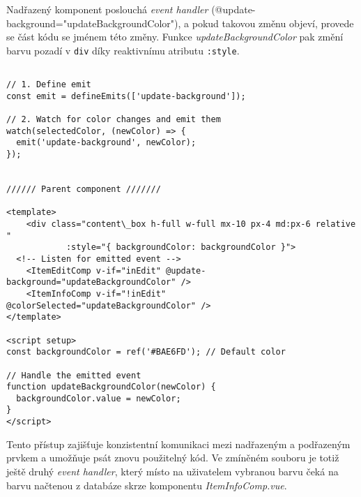 Nadřazený komponent poslouchá \textit{event handler} \newline (@update-background="updateBackgroundColor"), a pokud takovou změnu objeví, provede se část kódu se jménem této změny. Funkce \textit{updateBackgroundColor} pak změní barvu pozadí v \texttt{div} díky reaktivnímu atributu \texttt{:style}.

\newpage
  \begin{lstlisting}[style=JavaScript, firstnumber = 1, caption={Update background; itemEditComp.vue, content.vue}, label={emits}]

// 1. Define emit
const emit = defineEmits(['update-background']);

// 2. Watch for color changes and emit them
watch(selectedColor, (newColor) => {
  emit('update-background', newColor);
});


////// Parent component ///////

<template>
    <div class="content\_box h-full w-full mx-10 px-4 md:px-6 relative "  
            :style="{ backgroundColor: backgroundColor }">
  <!-- Listen for emitted event -->
    <ItemEditComp v-if="inEdit" @update-background="updateBackgroundColor" />
    <ItemInfoComp v-if="!inEdit" @colorSelected="updateBackgroundColor" />
</template>

<script setup>
const backgroundColor = ref('#BAE6FD'); // Default color

// Handle the emitted event
function updateBackgroundColor(newColor) {
  backgroundColor.value = newColor;
}
</script>

\end{lstlisting}

Tento přístup zajišťuje konzistentní komunikaci mezi nadřazeným a podřazeným prvkem a umožňuje psát znovu použitelný kód. Ve zmíněném souboru je totiž ještě druhý \textit{event handler}, který místo na uživatelem vybranou barvu čeká na barvu načtenou z databáze skrze komponentu \textit{ItemInfoComp.vue}.
